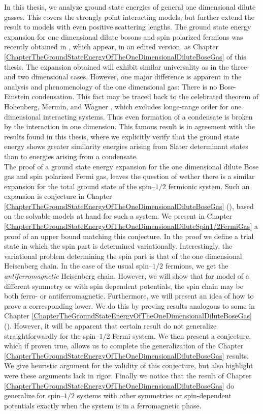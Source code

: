 In this thesis, we analyze ground state energies of general one dimensional dilute gasses. This covers the strongly point interacting models, but further extend the result to models with even positive scattering lengths. The ground state energy expansion for one dimensional dilute bosons and spin polarized fermions was recently obtained in \cite{agerskov2022ground}, which appear, in an edited version, as Chapter \ref{ChapterTheGroundStateEnergyOfTheOneDimensionalDiluteBoseGas} of this thesis. The expansion obtained will exhibit similar universality as in the three- and two dimensional cases. However, one major difference is apparent in the analysis and phenomenology of the one dimensional gas: There is no Bose-Einstein condensation. This fact may be traced back to the celebrated theorem of Hohenberg, Mermin, and Wagner \cite{hohenberg1967existence,mermin1966absence}, which excludes longe-range order for one dimensional interacting systems. Thus even formation of a condensate is broken by the interaction in one dimension. This famous result is in agreement with the results found in this thesis, where we explicitly verify that the ground state energy shows greater similarity energies arising from Slater determinant states than to energies arising from a condensate.\\
The proof of a ground state energy expansion for the one dimensional dilute Bose gas and spin polarized Fermi gas, leaves the question of wether there is a similar expansion for the total ground state of the spin--$ 1/2 $ fermionic system. Such an expansion is conjecture in Chapter \ref{ChapterTheGroundStateEnergyOfTheOneDimensionalDiluteBoseGas} (\cite{agerskov2022ground}), based on the solvable models at hand for such a system. We present in Chapter \ref{ChapterTheGroundStateEnergyOfTheOneDimensionalDiluteSpin1/2FermiGas} a proof of an upper bound matching this conjecture. In the proof we define a trial state in which the spin part is determined variationally. Interestingly, the variational problem determining the spin part is that of the one dimensional Heisenberg chain. In the case of the usual spin--$ 1/2 $ fermions, we get the \emph{antiferromagnetic} Heisenberg chain. However, we will show that for model of a different symmetry or with spin dependent potentials, the spin chain may be both ferro- or antiferromagnetic. Furthermore, we will present an idea of how to prove a corresponding lower. We do this by proving results analogous to some in Chapter \ref{ChapterTheGroundStateEnergyOfTheOneDimensionalDiluteBoseGas} (\cite{agerskov2022ground}). However, it will be apparent that certain result do not generalize straightforwardly for the spin--$ 1/2 $ Fermi system. We then present a conjecture, which if proven true, allows us to complete the generalization of the Chapter \ref{ChapterTheGroundStateEnergyOfTheOneDimensionalDiluteBoseGas} results. We give heuristic argument for the validity of this conjecture, but also highlight were these arguments lack in rigor. Finally we notice that the result of Chapter \ref{ChapterTheGroundStateEnergyOfTheOneDimensionalDiluteBoseGas} do generalize for spin--$ 1/2 $ systems with other symmetries or spin-dependent potentials exactly when the system is in a ferromagnetic phase.\\

